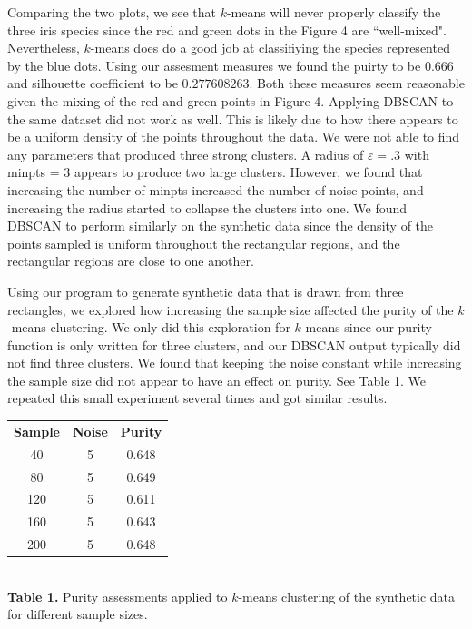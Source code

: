 \documentclass[psamsfonts,onesided,10pt]{amsart}
\begin{document}
Comparing the two plots, we see that $k$-means will never properly classify the three iris species 
since the red and green dots in the Figure 4 are ``well-mixed". Nevertheless, $k$-means 
does do a good job at classifiying the species represented by the blue dots. Using our assesment 
measures we found the puirty to be $0.666$ and silhouette coefficient to be $0.277608263$. 
Both these measures seem reasonable given the mixing of the red and green points in Figure 4. 
Applying DBSCAN to the same dataset did not work as well. This is likely due to how there appears
 to be a uniform density of the points throughout the data. We were not able to find any parameters that 
produced three strong clusters. A radius of $\varepsilon = .3$  with minpts = 3 appears to 
produce two large clusters. However, we found that increasing the number of minpts increased 
the number of noise points, and increasing the radius started to collapse the clusters into one. 
We found DBSCAN to perform similarly on the synthetic data since the density of the 
points sampled is uniform throughout the rectangular regions, and the rectangular regions are 
close to one another.

Using our program to generate synthetic data that is drawn from three rectangles, we explored 
how increasing the sample size affected the purity of the $k$-means clustering. We only did this 
exploration for $k$-means since our purity function is only written for three clusters, and our 
DBSCAN output typically did not find three clusters. We found that 
keeping the noise constant while increasing the sample size did not appear to have an effect on 
purity. See Table 1. We repeated this small experiment several times and got similar results. 

\vspace{1ex}
\begin{center}
\begin{tabular}{ |c|c|c| } 
 \hline
\textbf{Sample} & \textbf{Noise} & \textbf{Purity}\\ 
40 & 5 & 0.648 \\ 
80 & 5 & 0.649 \\ 
120 & 5 & 0.611 \\ 
160 & 5 & 0.643 \\ 
200 & 5 & 0.648 \\ 
 \hline
\end{tabular}\\
\textbf{Table 1.} Purity assessments applied to $k$-means clustering of the synthetic data for 
different sample sizes.
\end{center}
\vspace{1ex}
\end{document}

